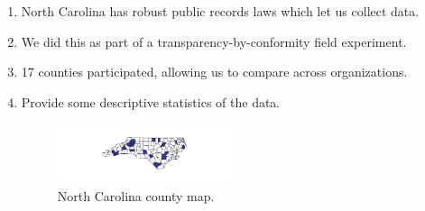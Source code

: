 \documentclass[fleqn]{MJDArticle}
\begin{document}
\begin{enumerate}
	\item North Carolina has robust public records laws which let us collect data.
	\item We did this as part of a transparency-by-conformity field experiment.
	\item 17 counties participated, allowing us to compare across organizations.
	\item Provide some descriptive statistics of the data.
	\begin{figure}[H]
		\centering
	\caption{\label{fig:nc map} North Carolina county map.}	
	\centering
	\includegraphics[width = 0.48\textwidth]{images/County_Map.pdf}
	\end{figure}
	

\end{enumerate}
\end{document}
